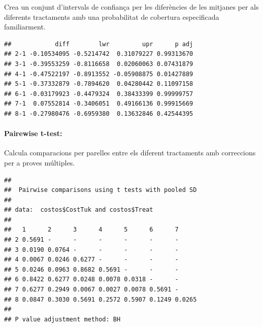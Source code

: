 \documentclass[11pt,a4paper]{article}\usepackage[]{graphicx}\usepackage[]{color}
\makeatletter
\newenvironment{kframe}{%
 \def\at@end@of@kframe{}%
 \ifinner\ifhmode%
  \def\at@end@of@kframe{\end{minipage}}%
  \begin{minipage}{\columnwidth}%
 \fi\fi%
 \def\FrameCommand##1{\hskip\@totalleftmargin \hskip-\fboxsep
 \colorbox{shadecolor}{##1}\hskip-\fboxsep
     \hskip-\linewidth \hskip-\@totalleftmargin \hskip\columnwidth}%
 \MakeFramed {\advance\hsize-\width
   \@totalleftmargin\z@ \linewidth\hsize
   \@setminipage}}%
 {\par\unskip\endMakeFramed%
 \at@end@of@kframe}
\newenvironment{knitrout}{}{} %
\makeatother
\begin{document}
Crea un conjunt d'intervals de confiança per les diferències de les mitjanes per als diferents tractaments amb una probabilitat de cobertura especificada familiarment.


\begin{knitrout}
\color{fgcolor}\begin{kframe}
\begin{verbatim}
##            diff        lwr         upr      p adj
## 2-1 -0.10534095 -0.5214742  0.31079227 0.99313670
## 3-1 -0.39553259 -0.8116658  0.02060063 0.07431879
## 4-1 -0.47522197 -0.8913552 -0.05908875 0.01427889
## 5-1 -0.37332879 -0.7894620  0.04280442 0.11097158
## 6-1 -0.03179923 -0.4479324  0.38433399 0.99999757
## 7-1  0.07552814 -0.3406051  0.49166136 0.99915669
## 8-1 -0.27980476 -0.6959380  0.13632846 0.42544395
\end{verbatim}
\end{kframe}
\end{knitrout}
\clearpage
\paragraph{Pairewise t-test:}

Calcula comparacions per parelles entre els diferent tractaments amb correccions per a proves múltiples.

\begin{knitrout}
\color{fgcolor}\begin{kframe}
\begin{verbatim}
## 
## 	Pairwise comparisons using t tests with pooled SD 
## 
## data:  costos$CostTuk and costos$Treat 
## 
##   1      2      3      4      5      6      7     
## 2 0.5691 -      -      -      -      -      -     
## 3 0.0190 0.0764 -      -      -      -      -     
## 4 0.0067 0.0246 0.6277 -      -      -      -     
## 5 0.0246 0.0963 0.8682 0.5691 -      -      -     
## 6 0.8422 0.6277 0.0248 0.0078 0.0318 -      -     
## 7 0.6277 0.2949 0.0067 0.0027 0.0078 0.5691 -     
## 8 0.0847 0.3030 0.5691 0.2572 0.5907 0.1249 0.0265
## 
## P value adjustment method: BH
\end{verbatim}
\end{kframe}
\end{knitrout}





\clearpage
\end{document}
